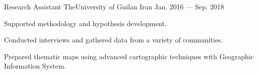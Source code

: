\begin{cventries}
{\begin{cvitems}
\vspace{0.8em}
\end{cvitems}
}
\cventry
{Research Assistant} %
{TheUniversity of Guilan} %
{Iran} %
{Jan. 2016 --- Sep. 2018} %
{
\begin{cvitems}
\item {Supported methodology and hypothesis development.}
\item {Conducted interviews and gathered data from a variety of communities.}
\item {Prepared thematic maps using advanced cartographic techniques with Geographic Information System.}
\end{cvitems}
}
\end{cventries}
